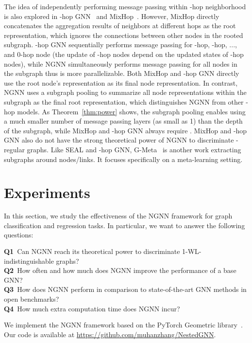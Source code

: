 \documentclass{article}
\begin{document}
The idea of independently performing message passing within -hop neighborhood is also explored in -hop GNN~\citep{nikolentzos2020k} and MixHop~\citep{abu2019mixhop}. However, MixHop directly concatenates the aggregation results of neighbors at different hops as the root representation, which ignores the connections between other nodes in the rooted subgraph. -hop GNN sequentially performs message passing for -hop, -hop, ..., and 0-hop node (the update of -hop nodes depend on the updated states of -hop nodes), while NGNN simultaneously performs message passing for all nodes in the subgraph thus is more parallelizable. Both MixHop and -hop GNN directly use the root node's representation as its final node representation. In contrast, NGNN uses a subgraph pooling to summarize all node representations within the subgraph as the final root representation, which distinguishes NGNN from other -hop models. As Theorem~\ref{thm:power} shows, the subgraph pooling enables using a much smaller number of message passing layers  (as small as 1) than the depth  of the subgraph, while MixHop and -hop GNN always require . 
MixHop and -hop GNN also do not have the strong theoretical power of NGNN to discriminate -regular graphs. Like SEAL and -hop GNN, G-Meta~\citep{huang2020graph} is another work extracting subgraphs around nodes/links. It focuses specifically on a meta-learning setting.




\section{Experiments}
In this section, we study the effectiveness of the NGNN framework for graph classification and regression tasks. In particular, we want to answer the following questions:

\textbf{Q1}~Can NGNN reach its theoretical power to discriminate 1-WL-indistinguishable graphs?\\
\textbf{Q2}~How often and how much does NGNN improve the performance of a base GNN?\\
\textbf{Q3}~How does NGNN perform in comparison to state-of-the-art GNN methods in open benchmarks?\\
\textbf{Q4}~How much extra computation time does NGNN incur?

We implement the NGNN framework based on the PyTorch Geometric library~\citep{fey2019fast}. Our code is available at \url{https://github.com/muhanzhang/NestedGNN}.
\end{document}
